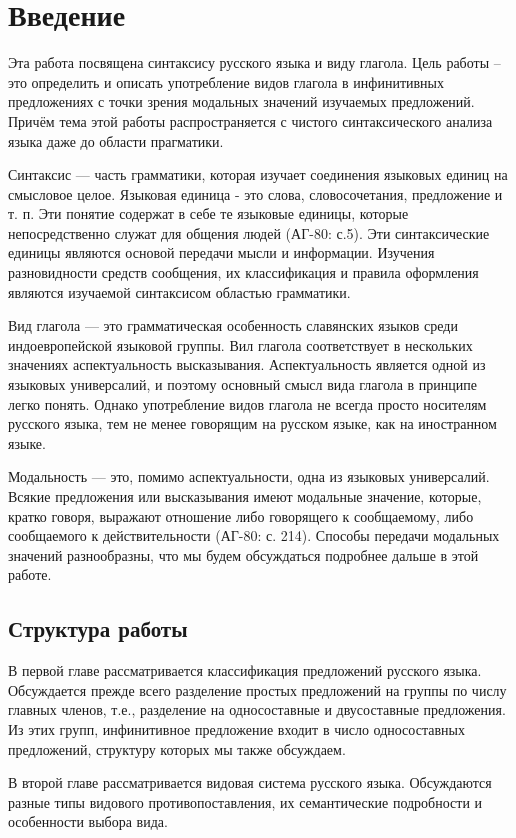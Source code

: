 \section{Введение}

Эта работа посвящена синтаксису русского языка и виду глагола. Цель работы -- это определить и описать употребление видов глагола в инфинитивных предложениях с точки зрения модальных значений изучаемых предложений. Причём тема этой работы распространяется с чистого синтаксического анализа языка даже до области прагматики.

Синтаксис --- часть грамматики, которая изучает соединения языковых единиц на смысловое целое. Языковая единица - это слова, словосочетания, предложение и т. п. Эти понятие содержат в себе те языковые единицы, которые непосредственно служат для общения людей (АГ-80: с.5). Эти синтаксические единицы являются основой передачи мысли и информации. Изучения разновидности средств сообщения, их классификация и правила оформления являются изучаемой синтаксисом областью грамматики.

Вид глагола --- это грамматическая особенность славянских языков среди индоевропейской языковой группы. Вил глагола соответствует в нескольких значениях аспектуальность высказывания. Аспектуальность является одной из языковых универсалий, и поэтому основный смысл вида глагола в принципе легко понять. Однако употребление видов глагола не всегда просто носителям русского языка, тем не менее говорящим на русском языке, как на иностранном языке.

Модальность --- это, помимо аспектуальности, одна из языковых универсалий. Всякие предложения или высказывания имеют модальные значение, которые, кратко говоря, выражают отношение либо говорящего к сообщаемому, либо сообщаемого к действительности (АГ-80: с. 214). Способы передачи модальных значений разнообразны, что мы будем обсуждаться подробнее дальше в этой работе.

\subsection*{Структура работы}

В первой главе рассматривается классификация предложений русского языка. Обсуждается прежде всего разделение простых предложений на группы по числу главных членов, т.е., разделение на односоставные и двусоставные предложения. Из этих групп, инфинитивное предложение входит в число односоставных предложений, структуру которых мы также обсуждаем.

В второй главе рассматривается видовая система русского языка. Обсуждаются разные типы видового противопоставления, их семантические подробности и особенности выбора вида.  

